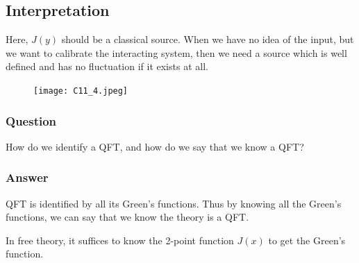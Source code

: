 \documentclass[14pt]{article} %
\begin{document}
{\subsection*{Interpretation}
Here, $J(y)$ should be a classical source. When we have no idea of the input, but we want to calibrate the interacting system, then we need a source which is well defined and has no fluctuation if it exists at all.
\begin{figure}[H]
    \centering
    \texttt{[image: C11\_4.jpeg]}
    \caption*{}
\end{figure}
\vspace{-1.5cm}
\begin{tcolorbox}
\subsubsection*{Question}
How do we identify a QFT, and how do we say that we know a QFT?
\subsubsection*{Answer}
QFT is identified by all its Green's functions. Thus by knowing all the Green's functions, we can say that we know the theory is a QFT.
\end{tcolorbox}
In free theory, it suffices to know the 2-point function $J(x)$ to get the Green's function.

}
\end{document}
